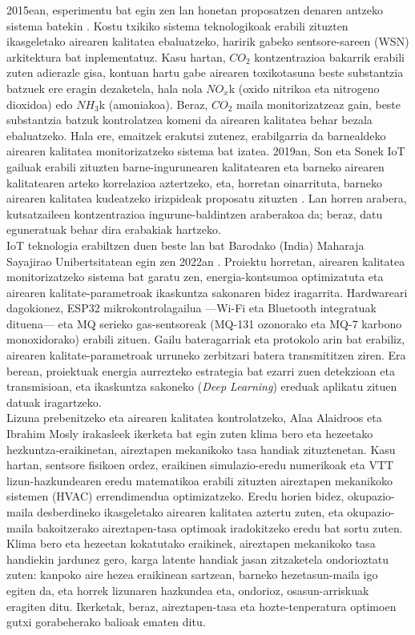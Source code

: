 \documentclass[10pt]{article}
\newcommand{\acpar}[1]{(\acs{#1})\acused{#1}}
\begin{document}
2015ean, esperimentu bat egin zen lan honetan proposatzen denaren antzeko sistema batekin \cite{marchetti2015campus}. Kostu txikiko sistema teknologikoak erabili zituzten ikasgeletako airearen kalitatea ebaluatzeko, haririk gabeko sentsore-sareen \acpar{WSN} arkitektura bat inplementatuz. Kasu hartan, $CO_2$ kontzentrazioa bakarrik erabili zuten adierazle gisa, kontuan hartu gabe airearen toxikotasuna beste substantzia batzuek ere eragin dezaketela, hala nola $NO_x$k (oxido nitrikoa eta nitrogeno dioxidoa) edo $NH_3$k (amoniakoa). Beraz, $CO_2$ maila monitorizatzeaz gain, beste substantzia batzuk kontrolatzea komeni da airearen kalitatea behar bezala ebaluatzeko. Hala ere, emaitzek erakutsi zutenez, erabilgarria da barnealdeko airearen kalitatea monitorizatzeko sistema bat izatea. 2019an, Son eta Sonek \ac{IoT} gailuak erabili zituzten barne-ingurunearen kalitatearen eta barneko airearen kalitatearen arteko korrelazioa aztertzeko, eta, horretan oinarrituta, barneko airearen kalitatea kudeatzeko irizpideak proposatu zituzten \cite{son2019correlation}. Lan horren arabera, kutsatzaileen kontzentrazioa ingurune-baldintzen araberakoa da; beraz, datu eguneratuak behar dira erabakiak hartzeko.\\

\ac{IoT} teknologia erabiltzen duen beste lan bat Barodako (India) Maharaja Sayajirao Unibertsitatean egin zen 2022an \cite{kantilal2022iot}. Proiektu horretan, airearen kalitatea monitorizatzeko sistema bat garatu zen, energia-kontsumoa optimizatuta eta airearen kalitate-parametroak ikaskuntza sakonaren bidez iragarrita. Hardwareari dagokionez, ESP32 mikrokontrolagailua ---Wi-Fi eta Bluetooth integratuak dituena--- eta MQ serieko gas-sentsoreak (MQ-131 ozonorako eta MQ-7 karbono monoxidorako) erabili zituen. Gailu bateragarriak eta protokolo arin bat erabiliz, airearen kalitate-parametroak urruneko zerbitzari batera transmititzen ziren. Era berean, proiektuak energia aurrezteko estrategia bat ezarri zuen detekzioan eta transmisioan, eta ikaskuntza sakoneko (\textit{Deep Learning}) ereduak aplikatu zituen datuak iragartzeko.\\

Lizuna prebenitzeko eta airearen kalitatea kontrolatzeko, Alaa Alaidroos eta Ibrahim Mosly \cite{alaidroos2023preventing} irakasleek ikerketa bat egin zuten klima bero eta hezeetako hezkuntza-eraikinetan, aireztapen mekanikoko tasa handiak zituztenetan. Kasu hartan, sentsore fisikoen ordez, eraikinen simulazio-eredu numerikoak eta \ac{VTT} lizun-hazkundearen eredu matematikoa erabili zituzten aireztapen mekanikoko sistemen \acpar{HVAC} errendimendua optimizatzeko. Eredu horien bidez, okupazio-maila desberdineko ikasgeletako airearen kalitatea aztertu zuten, eta okupazio-maila bakoitzerako aireztapen-tasa optimoak iradokitzeko eredu bat sortu zuten. Klima bero eta hezeetan kokatutako eraikinek, aireztapen mekanikoko tasa handiekin jardunez gero, karga latente handiak jasan zitzaketela ondorioztatu zuten: kanpoko aire hezea eraikinean sartzean, barneko hezetasun-maila igo egiten da, eta horrek lizunaren hazkundea eta, ondorioz, osasun-arriskuak eragiten ditu. Ikerketak, beraz, aireztapen-tasa eta hozte-tenperatura optimoen gutxi gorabeherako balioak ematen ditu.\\
\end{document}
